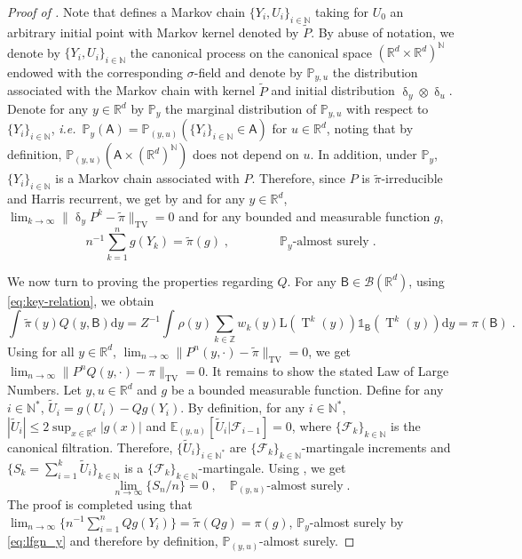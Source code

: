\documentclass{article}
\def\transfo{\operatorname{T}}
\def\rmd{\operatorname{d}\hspace{-2pt}}
\def\PP{\mathbb{P}}
\def\PE{\mathbb{E}}
\def\mcf{\mathcal{F}}
\def\rset{\mathbb{R}}
\def\nset{\mathbb{N}}
\def\nsets{\mathbb{N}^*}
\def\rmd{\mathrm{d}}
\def\eqsp{\,}
\def\msa{\mathsf{A}}
\def\borel{\mathcal{B}}
\newcommand{\abs}[1]{\left\vert #1 \right\vert}
\newcommand{\tvnorm}[1]{\| #1 \|_{\mathrm{TV}}}
\def\ie{\textit{i.e.}}
\def\eqsp{\;}
\newcommand{\1}{\mathds{1}}
\def\proposal{\rho}
\def\const{Z}
\def\tpi{\tilde{\pi}}
\def\msa{\mathsf{A}}
\def\msb{\mathsf{B}}
\def\mcf{\mathcal{F}}
\def\rset{\mathbb{R}}
\def\zset{\mathbb{Z}}
\def\nset{\mathbb{N}}
\def\nsets{\mathbb{N}^*}
\def\rmd{\mathrm{d}}
\def\likelihood{\mathrm{L}}
\def\tU{\tilde{U}}
\begin{document}
\begin{proof}[Proof of ]
Note that  defines a Markov chain
$\{Y_i,U_i\}_{i \in\nset}$ taking for $U_0$ an arbitrary initial point
with Markov kernel denoted by $\tilde{P}$. By abuse of notation, we
denote by $\{Y_i,U_i\}_{i \in\nset}$ the canonical process on the
canonical space $(\rset^d \times \rset^d)^{\nset}$ endowed with the
corresponding $\sigma$-field and denote by $\PP_{y,u}$ the
distribution associated with the Markov chain with kernel $\tilde{P}$
and initial distribution $\updelta_y \otimes \updelta_u$.  Denote for
any $y \in\rset^d$ by $\PP_y$ the marginal distribution of $\PP_{y,u}$
with respect to $\{Y_i\}_{i \in\nset}$,
\ie~$\PP_y(\msa) = \PP_{(y,u)}(\{Y_i\}_{i\in\nset} \in \msa)$ for
$u \in \rset^d$, noting that by definition,
$\PP_{(y,u)}(\msa \times (\rset^d)^{\nset})$ does not depend on
$u$. In addition, under $\PP_y$, $\{Y_i\}_{i \in\nset}$ is a Markov chain associated with $P$. Therefore, since $P$ is $\tpi$-irreducible and Harris recurrent, we get by \citep[Theorem 11.3.1]{douc:moulines:priouret:2018} and \citep[Theorem 2, 3]{tierney:1994} 
for any $y \in \rset^d$, $\lim_{k \to \infty}\tvnorm{\updelta_y P^k - \tpi} = 0$ and for any bounded and measurable function $g$,
\begin{equation}
  \label{eq:lfgn_y}
  \text{$n^{-1} \sum_{k=1}^n g(Y_k) = \tpi(g)$} \eqsp, \qquad \qquad \text{$\PP_y$-almost surely} \eqsp.
\end{equation}

We now turn to proving the properties regarding $Q$. For any $\msb\in\borel(\rset^d)$, using  \eqref{eq:key-relation}, we obtain
\begin{equation*}
    \int_{}\tpi(y)Q(y, \msb)\rmd y
    = \const^{-1}\int_{} \proposal(y) \sum_{k\in\zset} {w_k(y)\likelihood(\transfo^k(y)) }\1_\msb(\transfo^k(y)) \rmd y = \pi(\msb)\eqsp.
  \end{equation*}
  Using for all $y\in \rset^d$,
  $\lim_{n\to\infty} \tvnorm{P^n(y, \cdot) - \tpi} = 0$, we get
  $\lim_{n\to\infty} \tvnorm{P^n Q(y, \cdot) - \pi} = 0$.  It remains
  to show the stated Law of Large Numbers.  Let $y,u\in\rset^d$ and $g$
  be a bounded measurable function.  Define for any $i\in\nsets$, 
  $\tU_i = g(U_i) - Qg(Y_i)$.  By definition, for any $i\in\nsets$, $\abs{\tU_i} \leq 2\sup_{x\in\rset^d}|g(x)|$ and $\PE_{(y,u)}[\tU_{i}|\mcf_{i-1}] = 0$, where $\{\mcf_k\}_{k\in\nset}$ is the canonical filtration. Therefore, $\{\tU_i\}_{i\in\nsets}$ are $\{\mcf_k\}_{k\in\nset}$-martingale increments and 
  $\{S_k =\sum_{i=1}^k \tU_i\}_{k \in\nset}$ is a $\{\mcf_k\}_{k\in\nset}$-martingale. Using 
  \citep[Theorem 2.18]{hallheydebook}, we get 
  \begin{equation}
      \lim_{n\to\infty}\{S_n/n\} = 0\eqsp, \quad\PP_{(y,u)} \text{-almost surely}\eqsp. 
    \end{equation}
The proof is completed using that $\lim_{n\to \infty}\{n^{-1} \sum_{i=1}^n Qg(Y_i)\} = \tpi(Qg) = \pi(g)$, $\PP_{y}$-almost surely by \eqref{eq:lfgn_y} and therefore by definition, $\PP_{(y,u)}$-almost surely.
\end{proof}
\end{document}
